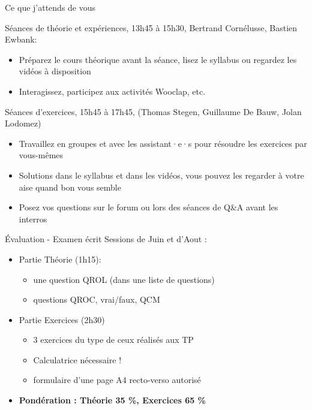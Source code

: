 \begin{frame}{Ce que j’attends de vous}

Séances de théorie et expériences, 13h45 à 15h30, Bertrand Cornélusse, Bastien Ewbank:
\begin{itemize}
  \item Préparez le cours théorique avant la séance, lisez le syllabus ou regardez les vidéos à disposition
  \item \alert{Interagissez}, participez aux activités Wooclap, etc.
\end{itemize}

Séances d’exercices, 15h45 à 17h45, (Thomas Stegen, Guillaume De Bauw, Jolan Lodomez)
\begin{itemize}
  \item Travaillez en groupes et avec les assistant·e·s pour résoudre les exercices par vous-mêmes
  \item Solutions dans le syllabus et dans les vidéos, vous pouvez les regarder à votre aise quand bon vous semble
  \item Posez vos questions sur le forum ou lors des séances de Q{\&}A avant les interros
\end{itemize}
\end{frame}

\begin{frame}{Évaluation - Examen écrit}
Sessions de Juin et d’Aout : 
  \begin{itemize}
    \item Partie Théorie (1h15):  
    \begin{itemize}
      \item une question QROL (\alert{dans une liste de questions})
      \item questions QROC, vrai/faux, QCM
    \end{itemize}
    \item Partie Exercices (2h30)	
    \begin{itemize}
      \item 3 exercices du type de ceux réalisés aux TP
      \item \alert{Calculatrice nécessaire !}
      \item formulaire d’une page A4 recto-verso autorisé
    \end{itemize}
    \item \textbf{Pondération : Théorie 35 \%, Exercices 65 \%}
  \end{itemize}

 

\end{frame}


